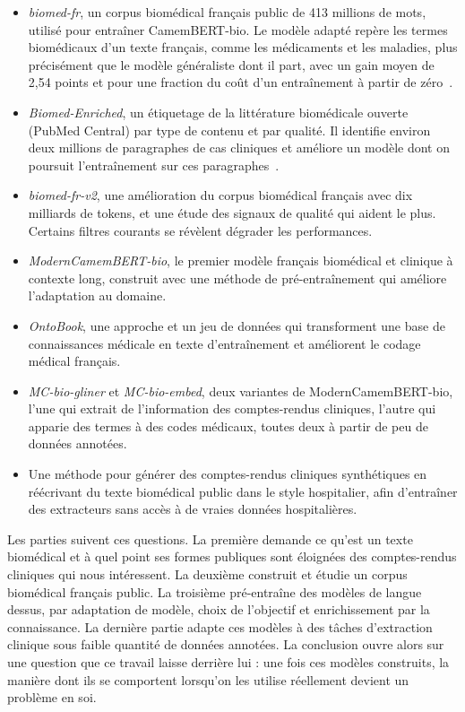 \begin{itemize}
  \item \emph{biomed-fr}, un corpus biomédical français public de 413 millions de mots, utilisé pour entraîner CamemBERT-bio. Le modèle adapté repère les termes biomédicaux d'un texte français, comme les médicaments et les maladies, plus précisément que le modèle généraliste dont il part, avec un gain moyen de 2,54 points et pour une fraction du coût d'un entraînement à partir de zéro~\citep{touchent2023camembertbio}.
  \item \emph{Biomed-Enriched}, un étiquetage de la littérature biomédicale ouverte (PubMed Central) par type de contenu et par qualité. Il identifie environ deux millions de paragraphes de cas cliniques et améliore un modèle dont on poursuit l'entraînement sur ces paragraphes~\citep{touchent-etal-2026-biomed}.
  \item \emph{biomed-fr-v2}, une amélioration du corpus biomédical français avec dix milliards de tokens, et une étude des signaux de qualité qui aident le plus. Certains filtres courants se révèlent dégrader les performances.
  \item \emph{ModernCamemBERT-bio}, le premier modèle français biomédical et clinique à contexte long, construit avec une méthode de pré-entraînement qui améliore l'adaptation au domaine.
  \item \emph{OntoBook}, une approche et un jeu de données qui transforment une base de connaissances médicale en texte d'entraînement et améliorent le codage médical français.
  \item \emph{MC-bio-gliner} et \emph{MC-bio-embed}, deux variantes de ModernCamemBERT-bio, l'une qui extrait de l'information des comptes-rendus cliniques, l'autre qui apparie des termes à des codes médicaux, toutes deux à partir de peu de données annotées.
  \item Une méthode pour générer des comptes-rendus cliniques synthétiques en réécrivant du texte biomédical public dans le style hospitalier, afin d'entraîner des extracteurs sans accès à de vraies données hospitalières.
\end{itemize}

\noindent Les parties suivent ces questions. La première demande ce qu'est un texte biomédical
et à quel point ses formes publiques sont éloignées des comptes-rendus cliniques qui
nous intéressent. La deuxième construit et étudie un corpus biomédical français
public. La troisième pré-entraîne des modèles de langue dessus, par adaptation de
modèle, choix de l'objectif et enrichissement par la connaissance. La dernière partie
adapte ces modèles à des tâches d'extraction clinique sous faible quantité de données
annotées. La conclusion ouvre alors sur une question que ce travail laisse derrière
lui : une fois ces modèles construits, la manière dont ils se comportent lorsqu'on les
utilise réellement devient un problème en soi.
